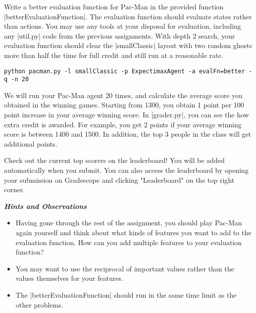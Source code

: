 \item {}
Write a better evaluation function for Pac-Man in the provided function
|betterEvaluationFunction|. The evaluation function should evaluate states
rather than actions. You may use any tools at your disposal for evaluation,
including any |util.py| code from the previous assignments. With depth 2 search,
your evaluation function should clear the |smallClassic| layout with two random
ghosts more than half the time for full credit and still run at a reasonable
rate.

\begin{lstlisting}
python pacman.py -l smallClassic -p ExpectimaxAgent -a evalFn=better -q -n 20
\end{lstlisting}

We will run your Pac-Man agent 20 times, and calculate the average score you
obtained in the winning games. Starting from 1300, you obtain 1 point per 100
point increase in your average winning score. In |grader.py|, you can see the
how extra credit is awarded. For example, you get 2 points if your average
winning score is between 1400 and 1500. In addition, the top 3 people in the
class will get additional points.

Check out the current top scorers on the leaderboard! You will be added
automatically when you submit. You can also access the leaderboard by opening
your submission on Gradescope and clicking "Leaderboard" on the top right
corner.

{\bf {\em Hints and Observations}}
\begin{itemize}
  \item Having gone through the rest of the assignment, you should play Pac-Man
  again yourself and think about what kinds of features you want to add to the
  evaluation function. How can you add multiple features to your evaluation
  function?
  \item You may want to use the reciprocal of important values rather than the
  values themselves for your features.
  \item The |betterEvaluationFunction| should run in the same time limit as the
  other problems.
\end{itemize}